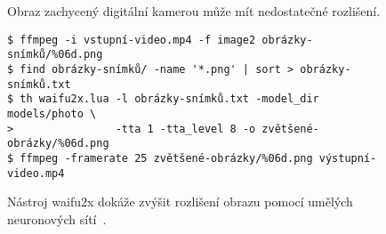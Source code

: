 \vspace{-15pt}%
\begingroup
{}%
\begin{subfigure}{\linewidth}

\caption{Obraz zachycený digitální kamerou může mít nedostatečné rozlišení.}
\end{subfigure}
\begin{subfigure}{\linewidth}
\par\vspace{7.5pt}%
\begingroup
\small
\begin{verbatim}
$ ffmpeg -i vstupní-video.mp4 -f image2 obrázky-snímků/%06d.png
$ find obrázky-snímků/ -name '*.png' | sort > obrázky-snímků.txt
$ th waifu2x.lua -l obrázky-snímků.txt -model_dir models/photo \
>                -tta 1 -tta_level 8 -o zvětšené-obrázky/%06d.png
$ ffmpeg -framerate 25 zvětšené-obrázky/%06d.png výstupní-video.mp4
\end{verbatim}
\endgroup

\caption{Nástroj waifu2x dokáže zvýšit rozlišení obrazu pomocí umělých neuronových sítí~\cite{dong2016image}.}
\end{subfigure}
\endgroup